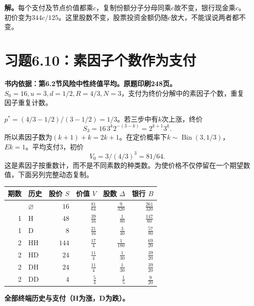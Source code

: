 \documentclass[11pt,a4paper,UTF8,fontset=fandol]{ctexart}
\begin{document}
\textbf{解。}每个支付及节点价值都乘\(c\)，复制份额分子分母同乘\(c\)故不变，银行现金乘\(c\)。初价变为\(\boxed{344c/125}\)。这里股数不变，股票投资金额仍随\(c\)放大，不能误说两者都不变。

\bigskip

\section{习题6.10：素因子个数作为支付}\label{ux4e60ux98986.10ux7d20ux56e0ux5b50ux4e2aux6570ux4f5cux4e3aux652fux4ed8}

\textbf{书内依据：第6.2节风险中性终值平均。原题印刷248页。}\(S_0=16,u=3,d=1/2,R=4/3,N=3\)，支付为终价分解中的素因子个数，重复因子重复计数。

\(p^*=(4/3-1/2)/(3-1/2)=1/3\)。若三步中有\(k\)次上涨，终价
\[S_3=16\,3^k2^{-(3-k)}=2^{k+1}3^k.\]
所以素因子数为\((k+1)+k=2k+1\)。在定价概率下\(k\sim\operatorname{Bin}(3,1/3)\)，\(Ek=1\)。平均支付3，初价
\[\boxed{V_0=3/(4/3)^3=81/64.}\]
这是素因子按重数计，而不是不同素数的种类数。为使价格不仅停留在一个期望数值，下面另列完整动态复制。

\begingroup
\small
\setlength{\tabcolsep}{4pt}
\renewcommand{\arraystretch}{1.10}

\begin{longtable}[]{@{}rlrrrr@{}}
\toprule\noalign{}
期数 & 历史 & 股价 \(S\) & 价值 \(V\) & 股数 \(\Delta\) & 银行 \(B\) \\
\midrule\noalign{}
\endhead
\bottomrule\noalign{}
\endlastfoot
0 & \(\varnothing\) & \(16\) & \(\frac{81}{64}\) & \(\frac{9}{320}\) &
\(\frac{261}{320}\) \\
1 & H & \(48\) & \(\frac{39}{16}\) & \(\frac{1}{80}\) &
\(\frac{147}{80}\) \\
1 & D & \(8\) & \(\frac{21}{16}\) & \(\frac{3}{40}\) &
\(\frac{57}{80}\) \\
2 & HH & \(144\) & \(\frac{17}{4}\) & \(\frac{1}{180}\) &
\(\frac{69}{20}\) \\
2 & HD & \(24\) & \(\frac{11}{4}\) & \(\frac{1}{30}\) &
\(\frac{39}{20}\) \\
2 & DH & \(24\) & \(\frac{11}{4}\) & \(\frac{1}{30}\) &
\(\frac{39}{20}\) \\
2 & DD & \(4\) & \(\frac{5}{4}\) & \(\frac{1}{5}\) & \(\frac{9}{20}\) \\
\end{longtable}

\textbf{全部终端历史与支付（H为涨，D为跌）。}
\end{document}
